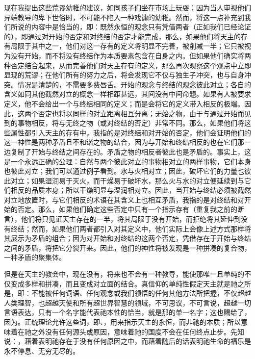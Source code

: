 现在我提出这些荒谬幼稚的建议，如同孩子们坐在市场上玩耍；因为当人审视他们异端教导的卑下世俗时，不可能不陷入一种戏谑的幼稚。然而，将这一点补充到我们所说的内容中是恰当的，即：既然永恒的观念只有凭借两者（正如我们已经论证的），即通过对开始的否定和对终结的否定才能完成，那么，如果他们将天主的存有局限于其中之一，他们对这一存有的定义将明显不完善，被削减一半；它只被视为没有开始，而不将没有终结作为本质要素包含在自身之内。但如果他们确实将两种否定结合起来，从而完善他们对天主存有的定义，那么再次观察这个观点中立即显现的荒谬；在他们所有的努力之后，将会发现它不仅与独生子冲突，也与自身冲突。情况是清楚的，不需要多费唇舌。开始的观念与终结的观念彼此对立；各自的含义如同其他截然对立的概念一样相距甚远，其间没有中间命题。如果有人被要求定义，他不会给出一个与终结相同的定义；而是会将它的定义带入相反的极端。因此，这两个否定也将以同样的对立距离相互分离；无始之物，由于与通过开始而见到的事物相反，将与无终之物（或对终结的否定）非常不同。那么，如果他们将这些属性都引入天主的存有中，我指的是对终结和对开始的否定，他们会证明他们的这一神性是两种矛盾且不和谐之物的结合，因为与开始和终结相反的也在它们那一边复制了开始与终结之间存在的。矛盾之物的相反者彼此也是矛盾的。事实上，这是一个永远正确的公理：自然与两个彼此对立的事物相对立的两样事物，它们本身也彼此对立；我们可以通过例子看到。水与火相对立；因此，破坏它们的力量也彼此对立；如果湿润易于灭火，而干燥易于破坏水，那么火与水的对立便延续到与它们相反的品质本身；所以干燥明显与湿润相对立。因此，当开始与终结必须被截然对立地放置时，与它们相反的术语在其含义上也相互矛盾，我指的是对终结和对开始的否定。那么，如果他们确定这些否定中只有一个指示存有（重复我之前的断言），他们将只见证天主存在的一半，将其局限于没有开始，而拒绝将其延伸到没有终结；然而，如果他们两者都引入对其定义中，他们实际上会像上述方式那样将其展示为矛盾的组合；因为对开始和对终结的这两个否定，凭借存在于开始与终结之间的矛盾，将把它分裂开来。因此，他们的神性将被发现是一种拼凑的复合物，一种矛盾的聚集体。\par

但是在天主的教会中，现在没有，将来也不会有一种教导，能使那唯一且单纯的不仅变成多样和拼凑，而且变成对立面的结合。真信仰的单纯性假定天主就是祂之所是，即：不能被任何词语、任何观念或我们领悟的任何其他方法所把握，不仅超越人类理智，也超越天使和所有超世界智慧的领域，不可思议，不可言说，超越一切言语表达，只有一个名字能代表祂本性的恰当，就是那的单一名字；这也赐给了，因为。正统理论允许这些词，即、，用来指示天主的永恒，而非祂的本质；所以意味着在祂之外没有任何源头或原因，意味着祂的国度不会在任何终点止步。先知说：，藉着表明祂存在于没有任何原因之中，而藉着随后的话表明祂生命的福乐是永不停息、无穷无尽的。\par

